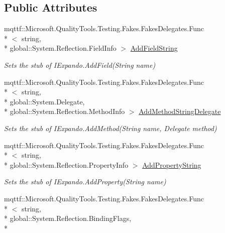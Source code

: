 \subsection*{Public Attributes}
\begin{DoxyCompactItemize}
\item 
mqttf\-::\-Microsoft.\-Quality\-Tools.\-Testing.\-Fakes.\-Fakes\-Delegates.\-Func\\*
$<$ string, \\*
global\-::\-System.\-Reflection.\-Field\-Info $>$ \hyperlink{class_system_1_1_runtime_1_1_interop_services_1_1_expando_1_1_fakes_1_1_stub_i_expando_af954df8acee2bb4c5812c664b38f548a}{Add\-Field\-String}
\begin{DoxyCompactList}\small\item\em Sets the stub of I\-Expando.\-Add\-Field(\-String name)\end{DoxyCompactList}\item 
mqttf\-::\-Microsoft.\-Quality\-Tools.\-Testing.\-Fakes.\-Fakes\-Delegates.\-Func\\*
$<$ string, \\*
global\-::\-System.\-Delegate, \\*
global\-::\-System.\-Reflection.\-Method\-Info $>$ \hyperlink{class_system_1_1_runtime_1_1_interop_services_1_1_expando_1_1_fakes_1_1_stub_i_expando_a4e039bd23eb49e307fce63290de90d15}{Add\-Method\-String\-Delegate}
\begin{DoxyCompactList}\small\item\em Sets the stub of I\-Expando.\-Add\-Method(\-String name, Delegate method)\end{DoxyCompactList}\item 
mqttf\-::\-Microsoft.\-Quality\-Tools.\-Testing.\-Fakes.\-Fakes\-Delegates.\-Func\\*
$<$ string, \\*
global\-::\-System.\-Reflection.\-Property\-Info $>$ \hyperlink{class_system_1_1_runtime_1_1_interop_services_1_1_expando_1_1_fakes_1_1_stub_i_expando_a3f7cc4a2d70b19d0ebfa42752bfb54e8}{Add\-Property\-String}
\begin{DoxyCompactList}\small\item\em Sets the stub of I\-Expando.\-Add\-Property(\-String name)\end{DoxyCompactList}\item 
mqttf\-::\-Microsoft.\-Quality\-Tools.\-Testing.\-Fakes.\-Fakes\-Delegates.\-Func\\*
$<$ string, \\*
global\-::\-System.\-Reflection.\-Binding\-Flags, \\*

\end{DoxyCompactItemize}
